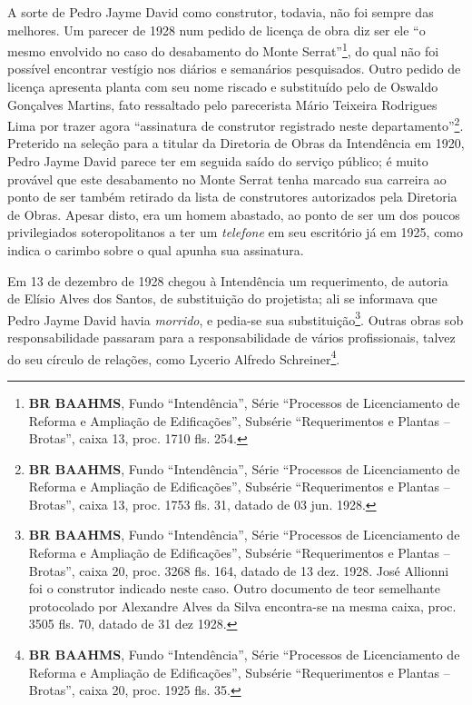 A sorte de Pedro Jayme David como construtor, todavia, não foi sempre das melhores. Um parecer de 1928 num pedido de licença de obra diz ser ele ``o mesmo envolvido no caso do desabamento do Monte Serrat''\footnote{\textbf{BR BAAHMS}, Fundo ``Intendência'', Série ``Processos de Licenciamento de Reforma e Ampliação de Edificações'', Subsérie ``Requerimentos e Plantas – Brotas'', caixa 13, proc. 1710 fls. 254.}, do qual não foi possível encontrar vestígio nos diários e semanários pesquisados. Outro pedido de licença apresenta planta com seu nome riscado e substituído pelo de Oswaldo Gonçalves Martins, fato ressaltado pelo parecerista Mário Teixeira Rodrigues Lima por trazer agora ``assinatura de construtor registrado neste departamento''\footnote{\textbf{BR BAAHMS}, Fundo ``Intendência'', Série ``Processos de Licenciamento de Reforma e Ampliação de Edificações'', Subsérie ``Requerimentos e Plantas – Brotas'', caixa 13, proc. 1753 fls. 31, datado de 03 jun. 1928.}. Preterido na seleção para a titular da Diretoria de Obras da Intendência em 1920, Pedro Jayme David parece ter em seguida saído do serviço público; é muito provável que este desabamento no Monte Serrat tenha marcado sua carreira ao ponto de ser também retirado da lista de construtores autorizados pela Diretoria de Obras. Apesar disto, era um homem abastado, ao ponto de ser um dos poucos privilegiados soteropolitanos a ter um \textit{telefone} em seu escritório já em 1925, como indica o carimbo sobre o qual apunha sua assinatura.

Em 13 de dezembro de 1928 chegou à Intendência um requerimento, de autoria de Elísio Alves dos Santos, de substituição do projetista; ali se informava que Pedro Jayme David havia \textit{morrido}, e pedia-se sua substituição\footnote{\textbf{BR BAAHMS}, Fundo ``Intendência'', Série ``Processos de Licenciamento de Reforma e Ampliação de Edificações'', Subsérie ``Requerimentos e Plantas – Brotas'', caixa 20, proc. 3268 fls. 164, datado de 13 dez. 1928. José Allionni foi o construtor indicado neste caso. Outro documento de teor semelhante protocolado por Alexandre Alves da Silva encontra-se na mesma caixa, proc. 3505 fls. 70, datado de 31 dez 1928.}. Outras obras sob responsabilidade passaram para a responsabilidade de vários profissionais, talvez do seu círculo de relações, como Lycerio Alfredo Schreiner\footnote{\textbf{BR BAAHMS}, Fundo ``Intendência'', Série ``Processos de Licenciamento de Reforma e Ampliação de Edificações'', Subsérie ``Requerimentos e Plantas – Brotas'', caixa 20, proc. 1925 fls. 35.}.

